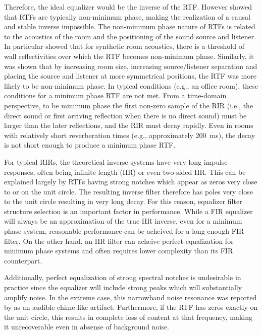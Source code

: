 Therefore, the ideal equalizer would be the inverse of the RTF. However \cite{neely1979invertibility} showed that RTFs are typically non-minimum phase, making the realization of a causal and stable inverse impossible. The non-minimum phase nature of RTFs is related to the acoustics of the room and the positioning of the sound source and listener. In particular \cite{neely1979invertibility} showed that for synthetic room acoustics, there is a threshold of wall reflectivities over which the RTF becomes non-minimum phase. Similarly, it was shown that by increasing room size, increasing source/listener separation and placing the source and listener at more symmetrical positions, the RTF was more likely to be non-minimum phase. In typical conditions (e.g., an office room), these conditions for a minimum phase RTF are not met. From a time-domain perspective, to be minimum phase the first non-zero sample of the RIR (i.e., the direct sound or first arriving reflection when there is no direct sound) must be larger than the later reflections, and the RIR must decay rapidly. Even in rooms with relatively short reverberation times (e.g., approximately \qty{200}{\milli\second}), the decay is not short enough to produce a minimum phase RTF.

For typical RIRs, the theoretical inverse systems have very long impulse responses, often being infinite length (IIR) or even two-sided IIR. This can be explained largely by RTFs having strong notches which appear as zeros very close to or on the unit circle. The resulting inverse filter therefore has poles very close to the unit circle resulting in very long decay. For this reason, equalizer filter structure selection is an important factor in performance. While a FIR equalizer will always be an approximation of the true IIR inverse, even for a minimum phase system, reasonable performance can be acheived for a long enough FIR filter. On the other hand, an IIR filter can acheive perfect equalization for minimum phase systems and often requires lower complexity than its FIR counterpart.

Additionally, perfect equalization of strong spectral notches is undesirable in practice since the equalizer will include strong peaks which will substantially amplify noise. In the extreme case, this narrowband noise resonance was reported by \cite{neely1979invertibility} as an audible chime-like artifact. Furthermore, if the RTF has zeros exactly on the unit circle, this results in complete loss of content at that frequency, making it unrecoverable even in absense of background noise.

